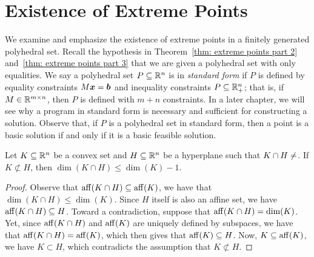 %

\section{Existence of Extreme Points}

We examine and emphasize the existence of extreme points in a finitely generated polyhedral set. Recall the hypothesis in Theorem~\ref{thm: extreme points part 2} and~\ref{thm: extreme points part 3} that we are given a polyhedral set with only equalities. We say a polyhedral set $P \subseteq \mathbb R^n$ is in {\em standard form} if $P$ is defined by equality constraints $M{\boldsymbol x} = {\boldsymbol b}$ and inequality constraints $P\subseteq \mathbb R^n_+$; that is, if $M\in\mathbb R^{m\times n}$, then $P$ is defined with $m+n$ constraints. In a later chapter, we will see why a program in standard form is necessary and sufficient for constructing a solution. Observe that, if $P$ is a polyhedral set in standard form, then a point is a basic solution if and only if it is a basic feasible solution. 

\begin{lemma}\label{lemma: dimension drops by hyperplane intersection}
Let $K\subseteq \mathbb R^{n}$ be a convex set and $H\subseteq \mathbb R^{n}$ be a hyperplane such that $K\cap H \neq \empty$. If $K\not\subset H$, then $\dim(K\cap H)\leq \dim(K) - 1$. 
\end{lemma}
\begin{proof}
Observe that $\operatorname{aff}(K\cap H)\subseteq \operatorname{aff}(K)$, we have that $\dim(K\cap H)\leq \dim(K)$. Since $H$ itself is also an affine set, we have $\operatorname{aff}(K\cap H)\subseteq H$. Toward a contradiction, suppose that $\operatorname{aff}(K\cap H) = \dim(K)$. Yet, since $\operatorname{aff}(K\cap H)$ and $\operatorname{aff}(K)$ are uniquely defined by subspaces, we have that $\operatorname{aff}(K\cap H) = \operatorname{aff}(K)$, which then gives that $\operatorname{aff}(K)\subseteq H$. Now, $K\subseteq \operatorname{aff}(K)$, we have $K\subset H$, which contradicts the assumption that $K\not\subset H$. 
\end{proof}


